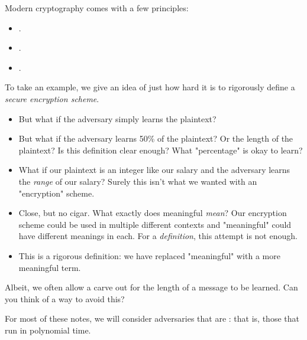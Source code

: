 Modern cryptography comes with a few principles:
\begin{itemize}
    \item {}.
    \item {}.
    \item {}.
\end{itemize}

\begin{example}
    To take an example, we give an idea of just how hard it is to rigorously define a \textit{secure encryption scheme}.
    \begin{itemize}
        \item {}

                But what if the adversary simply learns the plaintext?

        \item {}

                But what if the adversary learns 50\% of the plaintext? Or the length of the plaintext? Is this definition clear enough? What "percentage" is okay to learn?

        \item {}

                What if our plaintext is an integer like our salary and the adversary learns the \textit{range} of our salary? Surely this isn't what we wanted with an "encryption" scheme.

        \item {}

                Close, but no cigar. What exactly does meaningful \textit{mean}? Our encryption scheme could be used in multiple different contexts and "meaningful" could have different meanings in each. For a \textit{definition}, this attempt is not enough.

        \item {}

                This is a rigorous definition: we have replaced "meaningful" with a more meaningful term.
    \end{itemize}
\end{example}

\begin{remark}
    Albeit, we often allow a carve out for the length of a message to be learned. Can you think of a way to avoid this?
\end{remark}

\begin{remark}
    For most of these notes, we will consider adversaries that are : that is, those that run in polynomial time.
\end{remark}

